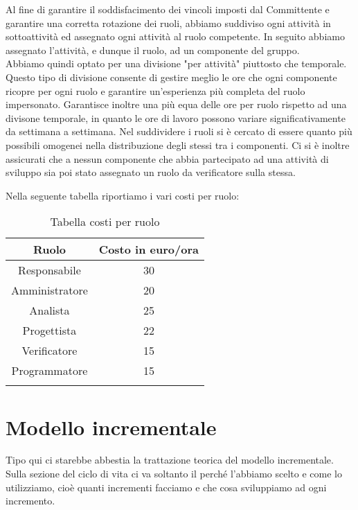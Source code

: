 Al fine di garantire il soddisfacimento dei vincoli imposti dal Committente e garantire una corretta rotazione dei ruoli, abbiamo suddiviso ogni attività in sottoattività ed assegnato ogni attività al ruolo competente.
In seguito abbiamo assegnato l'attività, e dunque il ruolo, ad un componente del gruppo.\\ Abbiamo quindi optato per una divisione "per attività" piuttosto che temporale. Questo tipo di divisione consente di gestire meglio le ore che ogni componente ricopre per ogni ruolo e garantire un'esperienza più completa del ruolo impersonato. Garantisce inoltre una più equa  delle ore per ruolo rispetto ad una divisone temporale, in quanto le ore di lavoro possono variare significativamente da settimana a settimana.
Nel suddividere i ruoli si è cercato di essere quanto più possibili omogenei nella distribuzione degli stessi tra i componenti. Ci si è inoltre assicurati che a nessun componente che abbia partecipato ad una attività di sviluppo sia poi stato assegnato un ruolo da verificatore sulla stessa.


Nella seguente tabella riportiamo i vari costi per ruolo:
\begin{center}
\begin{longtable}{|c|c|}
\toprule
\textbf{Ruolo} & \textbf{Costo in euro/ora}\\
\midrule
Responsabile & 30\\
Amministratore & 20\\
Analista & 25\\
Progettista & 22\\
Verificatore & 15\\
Programmatore & 15\\
\bottomrule
\caption{Tabella costi per ruolo}
\label{tab:costiruolo}
\end{longtable}
\end{center}

\section{Modello incrementale}
Tipo qui ci starebbe abbestia la trattazione teorica del modello incrementale. Sulla sezione del ciclo di vita ci
va soltanto il perché l'abbiamo scelto e come lo utilizziamo, cioè quanti incrementi facciamo e che cosa sviluppiamo ad ogni incremento.



